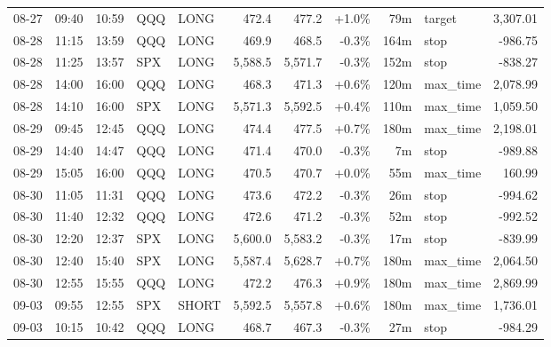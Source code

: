 \documentclass[11pt,a4paper,twoside]{article}
\begin{document}
\begin{center}
\begin{longtable}{>{\color{txtmain}}l l l l l r r r r >{\color{txtmain}}l r}
08-27 & 09:40 & 10:59 & QQQ & LONG & 472.4 & 477.2 & \textcolor{wingreen}{+1.0\%} & 79m & target & \textcolor{wingreen}{3,307.01} \\
08-28 & 11:15 & 13:59 & QQQ & LONG & 469.9 & 468.5 & \textcolor{lossred}{-0.3\%} & 164m & stop & \textcolor{lossred}{-986.75} \\
08-28 & 11:25 & 13:57 & SPX & LONG & 5,588.5 & 5,571.7 & \textcolor{lossred}{-0.3\%} & 152m & stop & \textcolor{lossred}{-838.27} \\
08-28 & 14:00 & 16:00 & QQQ & LONG & 468.3 & 471.3 & \textcolor{wingreen}{+0.6\%} & 120m & max\_time & \textcolor{wingreen}{2,078.99} \\
08-28 & 14:10 & 16:00 & SPX & LONG & 5,571.3 & 5,592.5 & \textcolor{wingreen}{+0.4\%} & 110m & max\_time & \textcolor{wingreen}{1,059.50} \\
08-29 & 09:45 & 12:45 & QQQ & LONG & 474.4 & 477.5 & \textcolor{wingreen}{+0.7\%} & 180m & max\_time & \textcolor{wingreen}{2,198.01} \\
08-29 & 14:40 & 14:47 & QQQ & LONG & 471.4 & 470.0 & \textcolor{lossred}{-0.3\%} & 7m & stop & \textcolor{lossred}{-989.88} \\
08-29 & 15:05 & 16:00 & QQQ & LONG & 470.5 & 470.7 & \textcolor{wingreen}{+0.0\%} & 55m & max\_time & \textcolor{wingreen}{160.99} \\
08-30 & 11:05 & 11:31 & QQQ & LONG & 473.6 & 472.2 & \textcolor{lossred}{-0.3\%} & 26m & stop & \textcolor{lossred}{-994.62} \\
08-30 & 11:40 & 12:32 & QQQ & LONG & 472.6 & 471.2 & \textcolor{lossred}{-0.3\%} & 52m & stop & \textcolor{lossred}{-992.52} \\
08-30 & 12:20 & 12:37 & SPX & LONG & 5,600.0 & 5,583.2 & \textcolor{lossred}{-0.3\%} & 17m & stop & \textcolor{lossred}{-839.99} \\
08-30 & 12:40 & 15:40 & SPX & LONG & 5,587.4 & 5,628.7 & \textcolor{wingreen}{+0.7\%} & 180m & max\_time & \textcolor{wingreen}{2,064.50} \\
08-30 & 12:55 & 15:55 & QQQ & LONG & 472.2 & 476.3 & \textcolor{wingreen}{+0.9\%} & 180m & max\_time & \textcolor{wingreen}{2,869.99} \\
09-03 & 09:55 & 12:55 & SPX & SHORT & 5,592.5 & 5,557.8 & \textcolor{wingreen}{+0.6\%} & 180m & max\_time & \textcolor{wingreen}{1,736.01} \\
09-03 & 10:15 & 10:42 & QQQ & LONG & 468.7 & 467.3 & \textcolor{lossred}{-0.3\%} & 27m & stop & \textcolor{lossred}{-984.29} \\

\end{longtable}
\end{center}
\end{document}

